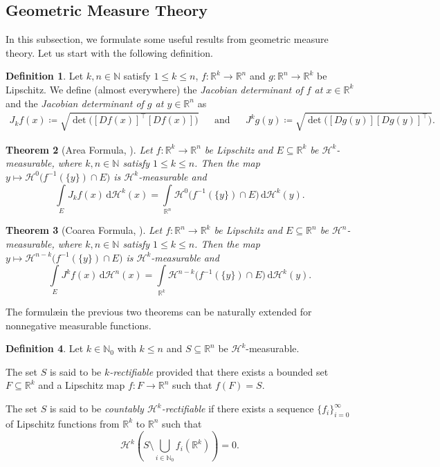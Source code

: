 \documentclass[pdflatex,sn-mathphys-num]{sn-jnl}
\theoremstyle{plain}
\newtheorem{theorem}{Theorem}[section]
\theoremstyle{definition}
\newtheorem{definition}[theorem]{Definition}
\newcommand{\dH}[1]{\,\mathrm d\mathcal{H}^{#1}}
\begin{document}
 \subsection{Geometric Measure Theory}
In this subsection, we formulate some useful results from geometric measure theory. Let us start with the following definition. 
\begin{definition}
        Let $k, n\in\mathbb{N}$ satisfy $1\leq k\leq n$, $f\colon\mathbb{R}^k\to\mathbb{R}^n$ and 
        $g\colon\mathbb{R}^n\to\mathbb{R}^k$ be Lipschitz. We define (almost everywhere) the \textit{Jacobian determinant of $f$ at $x\in\mathbb{R}^k$} and
        the \textit{Jacobian determinant of $g$ at $y\in\mathbb{R}^n$} as \begin{align*}
            J_kf(x)\coloneq \sqrt{\det\big([Df(x)]^{\top}[D f(x)]\big)}&&\text{and}&&J^kg(y)\coloneq \sqrt{\det\big([Dg(y)][Dg(y)]^{\top}\big)}.
        \end{align*}
\end{definition}

\begin{theorem}[Area Formula, ] Let  $f\colon\mathbb{R}^k\to\mathbb{R}^n$ be Lipschitz and $E\subseteq\mathbb{R}^k$ be $\mathcal{H}^k$-measurable, where $k, n\in\mathbb{N}$ satisfy $1\leq k\leq n$. Then the map $y\mapsto \mathcal{H}^{0}\big(f^{-1}(\{y\})\cap E\big)$ is $\mathcal{H}^k$-measurable and $$\int\limits_{E}J_kf(x)\dH{k}(x)=\int\limits_{\mathbb{R}^n}\mathcal{H}^{0}\big(f^{-1}(\{y\})\cap E\big)\dH{k}(y).$$
    
\end{theorem}
\begin{theorem}[Coarea Formula, ]  Let  $f\colon\mathbb{R}^n\to\mathbb{R}^k$ be Lipschitz and $E\subseteq\mathbb{R}^n$ be $\mathcal{H}^n$-measurable, where $k, n\in\mathbb{N}$ satisfy $1\leq k\leq n$. Then the map $y\mapsto \mathcal{H}^{n-k}\big(f^{-1}(\{y\})\cap E\big)$ is $\mathcal{H}^k$-measurable and $$\int\limits_{E}J^kf(x)\dH{n}(x)=\int\limits_{\mathbb{R}^k}\mathcal{H}^{n-k}\big(f^{-1}(\{y\})\cap E\big)\dH{k}(y).$$
\end{theorem}

The formul\ae in the previous two theorems can be naturally extended for nonnegative measurable functions.

\begin{definition}
        Let $k\in\mathbb{N}_0$ with $k\leq n$ and $S\subseteq\mathbb{R}^n$ be $\mathcal{H}^k$-measurable. 
        
        The set $S$ is said to be \textit{$k$-rectifiable} provided that there exists a bounded set $F\subseteq\mathbb{R}^k$ and a Lipschitz map $f\colon F\to\mathbb{R}^n$ such that $f(F)=S.$
        
        The set $S$ is said to be \textit{countably $\mathcal{H}^{k}$-rectifiable} if there exists a sequence $\{f_i\}_{i=0}^{\infty}$ of Lipschitz functions from $\mathbb{R}^k$ to $\mathbb{R}^n$ such that $$\mathcal{H}^k\left(S\setminus \bigcup_{i\in\mathbb{N}_0}f_i\left(\mathbb{R}^k\right)\right)=0.$$
 \end{definition}
\end{document}
